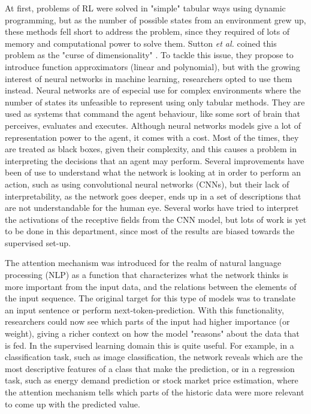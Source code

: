 At first, problems of RL were solved in "simple" tabular ways using dynamic programming, but as the number of possible states from an environment grew up, these methods fell short to address the problem, since they required of lots of memory and computational power to solve them. Sutton \textit{et al.} coined this problem as the "curse of dimensionality" \cite{intro_rl}. To tackle this issue, they propose to introduce function approximators (linear and polynomial), but with the growing interest of neural networks in machine learning, researchers opted to use them instead. Neural networks are of especial use for complex environments where the number of states its unfeasible to represent using only tabular methods. They are used as systems that command the agent behaviour, like some sort of brain that perceives, evaluates and executes. Although neural networks models give a lot of representation power to the agent, it comes with a cost. Most of the times, they are treated as black boxes, given their complexity, and this causes a problem in interpreting the decisions that an agent may perform. Several improvements have been of use to understand what the network is looking at in order to perform an action, such as using convolutional neural networks (CNNs), but their lack of interpretability, as the network goes deeper, ends up in a set of descriptions that are not understandable for the human eye. Several works \cite{bach2015pixel, Selvaraju_2019, Chattopadhay_2018, Muhammad_2020} have tried to interpret the activations of the receptive fields from the CNN model, but lots of work is yet to be done in this department, since most of the results are biased towards the supervised set-up.

 The attention mechanism was introduced for the realm of natural language processing (NLP) as a function that characterizes what the network thinks is more important from the input data, and the relations between the elements of the input sequence. The original target for this type of models was to translate an input sentence or perform next-token-prediction. With this functionality, researchers could now see which parts of the input had higher importance (or weight), giving a richer context on how the model "reasons" about the data that is fed. In the supervised learning domain this is quite useful. For example, in a classification task, such as image classification, the network reveals which are the most descriptive features of a class that make the prediction, or in a regression task, such as energy demand prediction or stock market price estimation, where the attention mechanism tells which parts of the historic data were more relevant to come up with the predicted value. 
 
